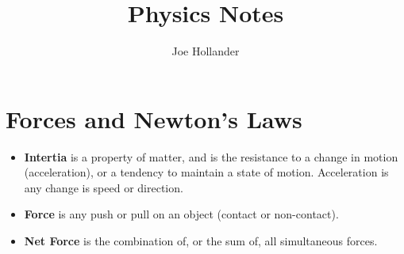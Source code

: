 \documentclass{article}
\title{Physics Notes}
\author{Joe Hollander}
\begin{document}
\maketitle 

\section*{Forces and Newton's Laws}
\begin{itemize} 
    \item \textbf{Intertia} is a property of matter, 
and is the resistance to a change in motion (acceleration),
or a tendency to maintain a state of motion. 
Acceleration is any change is speed or direction.

    \item \textbf{Force} is any push or pull on an object (contact or non-contact).
    \item \textbf{Net Force} is the combination of, or the sum of, all simultaneous forces.
\end{itemize}
\end{document}
